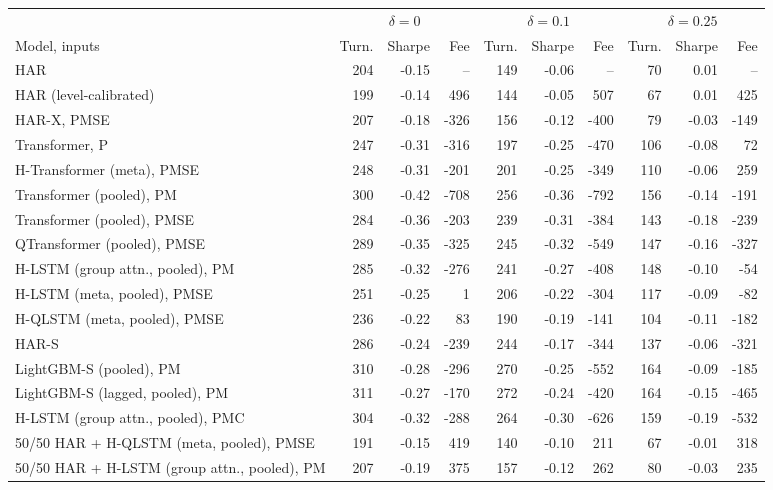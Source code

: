 \setlength{\tabcolsep}{3pt}
\begin{tabular}{lrrrrrrrrr}
\toprule
 & \multicolumn{3}{c}{$\delta = 0$} & \multicolumn{3}{c}{$\delta = 0.1$} & \multicolumn{3}{c}{$\delta = 0.25$} \\
\cmidrule(lr){2-4}\cmidrule(lr){5-7}\cmidrule(lr){8-10}
Model, inputs & Turn. & Sharpe & Fee & Turn. & Sharpe & Fee & Turn. & Sharpe & Fee \\
\midrule
HAR & 204 & -0.15 & -- & 149 & -0.06 & -- & 70 & 0.01 & -- \\
HAR (level-calibrated) & 199 & -0.14 & 496 & 144 & -0.05 & 507 & 67 & 0.01 & 425 \\
HAR-X, PMSE & 207 & -0.18 & -326 & 156 & -0.12 & -400 & 79 & -0.03 & -149 \\
Transformer, P & 247 & -0.31 & -316 & 197 & -0.25 & -470 & 106 & -0.08 & 72 \\
H-Transformer (meta), PMSE & 248 & -0.31 & -201 & 201 & -0.25 & -349 & 110 & -0.06 & 259 \\
Transformer (pooled), PM & 300 & -0.42 & -708 & 256 & -0.36 & -792 & 156 & -0.14 & -191 \\
Transformer (pooled), PMSE & 284 & -0.36 & -203 & 239 & -0.31 & -384 & 143 & -0.18 & -239 \\
QTransformer (pooled), PMSE & 289 & -0.35 & -325 & 245 & -0.32 & -549 & 147 & -0.16 & -327 \\
H-LSTM (group attn., pooled), PM & 285 & -0.32 & -276 & 241 & -0.27 & -408 & 148 & -0.10 & -54 \\
H-LSTM (meta, pooled), PMSE & 251 & -0.25 & 1 & 206 & -0.22 & -304 & 117 & -0.09 & -82 \\
H-QLSTM (meta, pooled), PMSE & 236 & -0.22 & 83 & 190 & -0.19 & -141 & 104 & -0.11 & -182 \\
HAR-S & 286 & -0.24 & -239 & 244 & -0.17 & -344 & 137 & -0.06 & -321 \\
LightGBM-S (pooled), PM & 310 & -0.28 & -296 & 270 & -0.25 & -552 & 164 & -0.09 & -185 \\
LightGBM-S (lagged, pooled), PM & 311 & -0.27 & -170 & 272 & -0.24 & -420 & 164 & -0.15 & -465 \\
H-LSTM (group attn., pooled), PMC & 304 & -0.32 & -288 & 264 & -0.30 & -626 & 159 & -0.19 & -532 \\
50/50 HAR + H-QLSTM (meta, pooled), PMSE & 191 & -0.15 & 419 & 140 & -0.10 & 211 & 67 & -0.01 & 318 \\
50/50 HAR + H-LSTM (group attn., pooled), PM & 207 & -0.19 & 375 & 157 & -0.12 & 262 & 80 & -0.03 & 235 \\

\end{tabular}
